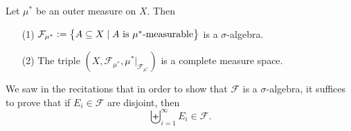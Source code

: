 \documentclass[11pt,a4paper]{article}
\begin{document}
\begin{theorem}
  \label{thm:car-outer-measure}
  Let $\mu^*$ be an outer measure on $X$. Then
  \begin{enumerate}
    \item[(1)] $\mathcal F_{\mu^*} := 
      \set{A \subseteq X \mid A \text{ is }\mu^*\text{-measurable}}$ is a 
      $\sigma$-algebra.
    \item[(2)] The triple
      $(X, \mathcal F_{\mu^*}, \mu^*\vert_{\mathcal F_{\mu^*}})$
      is a complete measure space.
  \end{enumerate}
\end{theorem}
\begin{remark} \label{recitations-one}
  We saw in the recitations that in order
  to show that $\mathcal F$ is a $\sigma$-algebra, it suffices to prove that
  if $E_i \in \mathcal F$ are disjoint, then
  \[
    \biguplus_{i=1}^{\infty} E_i \in \mathcal F.
  \]
\end{remark}
\end{document}
